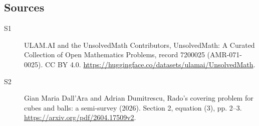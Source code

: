 \documentclass[11pt]{article}
\begin{document}
\subsection{Sources}
\begin{description}
\item[\hypertarget{source:7200025:1}{S1}] ULAM.AI and the UnsolvedMath Contributors, UnsolvedMath: A Curated Collection of Open Mathematics Problems, record 7200025 (AMR-071-0025). CC BY 4.0. \url{https://huggingface.co/datasets/ulamai/UnsolvedMath}.
\item[\hypertarget{source:7200025:2}{S2}] Gian Maria Dall’Ara and Adrian Dumitrescu, Rado’s covering problem for cubes and balls: a semi-survey (2026). Section 2, equation (3), pp. 2–3. \url{https://arxiv.org/pdf/2604.17509v2}.
\end{description}
\label{end:7200025}
\end{document}
